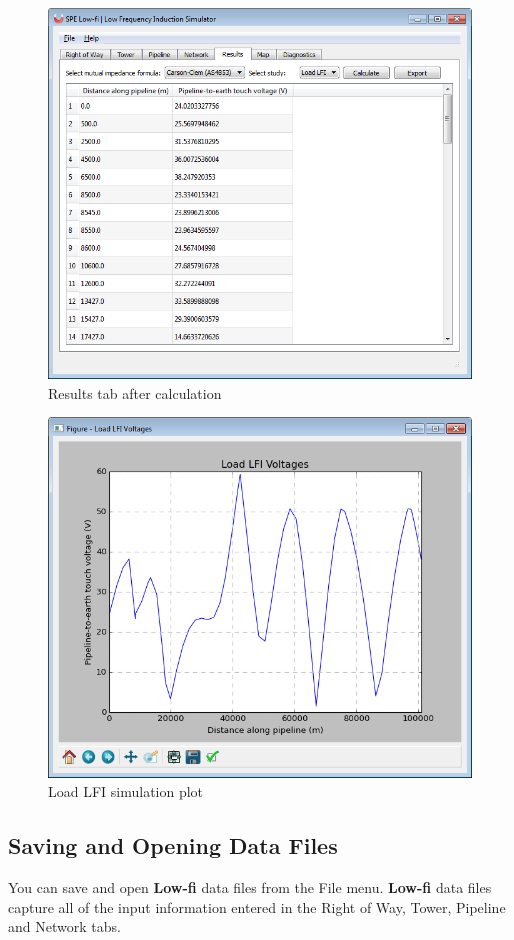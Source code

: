 \documentclass{article}
\begin{document}
\begin{figure}[!htpb]
\begin{center}
\caption{Results tab after calculation}
\label{fig:results_after_calc}
\includegraphics[width=0.7\linewidth]{./Figures/results_2.png}
\end{center}
\end{figure}

\begin{figure}[!htpb]
\begin{center}
\caption{Load LFI simulation plot}
\label{fig:results_plot}
\includegraphics[width=0.7\linewidth]{./Figures/plot.png}
\end{center}
\end{figure}

\newpage
\subsection{Saving and Opening Data Files}
You can save and open \textbf{Low-fi} data files from the File menu. \textbf{Low-fi} data files capture all of the input information entered in the Right of Way, Tower, Pipeline and Network tabs. 
\end{document}
